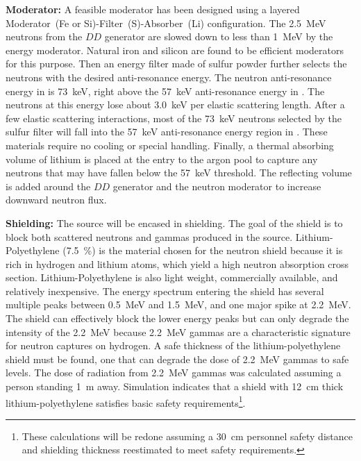 {\bf Moderator:}  A feasible moderator has been designed using a layered Moderator~(Fe or Si)-Filter~(S)-Absorber~(Li) %
configuration. The \SI{2.5}{\MeV} neutrons from the $DD$ generator are slowed down to less than \SI{1}{\MeV} by the energy moderator. Natural iron and silicon are found to be efficient moderators for this purpose. Then an energy filter made of sulfur powder further selects the neutrons with the desired anti-resonance energy.
The neutron anti-resonance energy in  is \SI{73}{\keV}, right above the \SI{57}{\keV} anti-resonance energy in . The neutrons at this energy lose about \SI{3.0}{\keV} per elastic scattering length. After a few elastic scattering interactions, most of the \SI{73}{\keV} neutrons selected by the sulfur filter will fall into the \SI{57}{\keV} anti-resonance energy region in . These materials require no cooling or special handling. Finally, a thermal absorbing volume of lithium is placed at the entry to the argon pool to capture any neutrons that may have fallen below the \SI{57}{\keV} threshold. The reflecting volume is added around the $DD$ generator and the neutron moderator to increase downward neutron flux. %


{\bf Shielding:} The source will be encased in shielding. The goal of the shield is to block both scattered neutrons and gammas produced in the source. Lithium-Polyethylene (\SI{7.5}{\%}) is the material chosen for the neutron shield because it is rich in hydrogen and lithium atoms, which yield a high neutron absorption cross section. Lithium-Polyethylene is also light weight, commercially available, and relatively inexpensive. The energy spectrum entering the shield has several multiple peaks between \SI{0.5}{\MeV} and \SI{1.5}{\MeV}, and one major spike at \SI{2.2}{\MeV}. The shield can effectively block the lower energy peaks but can only degrade the intensity of the \SI{2.2}{\MeV} because \SI{2.2}{\MeV} gammas are a characteristic signature for neutron captures on hydrogen. A safe thickness of the lithium-polyethylene shield must be found, one that can degrade the dose of \SI{2.2}{\MeV} gammas to safe levels. The dose of radiation from \SI{2.2}{\MeV} gammas was calculated assuming a person standing \SI{1}{\m} away. Simulation indicates that a shield with \SI{12}{\cm} thick lithium-polyethylene satisfies basic safety requirements\footnote{These calculations will be redone assuming a \SI{30}{\cm} personnel safety distance and shielding thickness reestimated to meet  safety requirements.}. 

